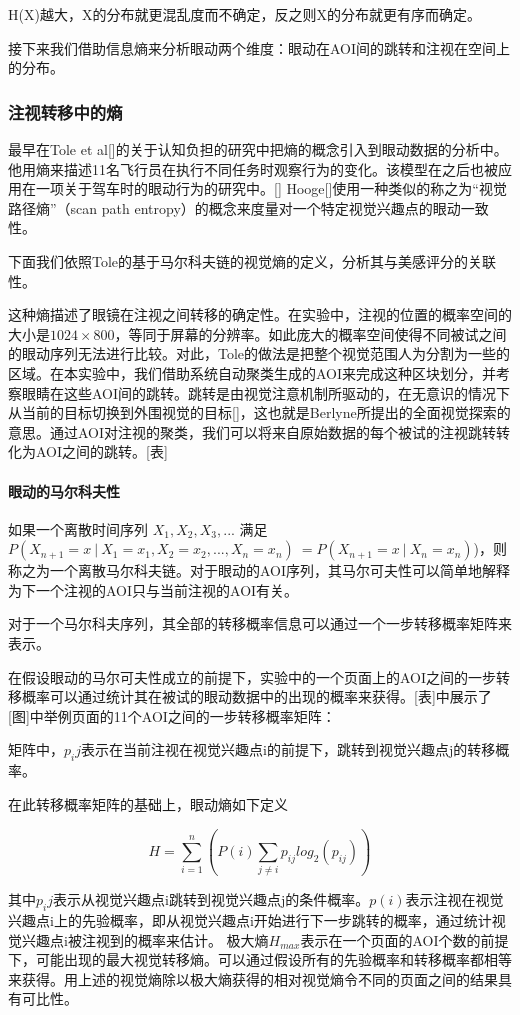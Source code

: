 H(X)越大，X的分布就更混乱度而不确定，反之则X的分布就更有序而确定。

接下来我们借助信息熵来分析眼动两个维度：眼动在AOI间的跳转和注视在空间上的分布。

\subsubsection{注视转移中的熵}
最早在Tole et al[]的关于认知负担的研究中把熵的概念引入到眼动数据的分析中。他用熵来描述11名飞行员在执行不同任务时观察行为的变化。该模型在之后也被应用在一项关于驾车时的眼动行为的研究中。[]
Hooge[]使用一种类似的称之为“视觉路径熵”（scan path entropy）的概念来度量对一个特定视觉兴趣点的眼动一致性。

下面我们依照Tole的基于马尔科夫链的视觉熵的定义，分析其与美感评分的关联性。

这种熵描述了眼镜在注视之间转移的确定性。在实验中，注视的位置的概率空间的大小是$1024\times800$，等同于屏幕的分辨率。如此庞大的概率空间使得不同被试之间的眼动序列无法进行比较。对此，Tole的做法是把整个视觉范围人为分割为一些的区域。在本实验中，我们借助系统自动聚类生成的AOI来完成这种区块划分，并考察眼睛在这些AOI间的跳转。跳转是由视觉注意机制所驱动的，在无意识的情况下从当前的目标切换到外围视觉的目标[]，这也就是Berlyne所提出的全面视觉探索的意思。通过AOI对注视的聚类，我们可以将来自原始数据的每个被试的注视跳转转化为AOI之间的跳转。[表]

\paragraph{眼动的马尔科夫性}
如果一个离散时间序列 $X_1,X_2,X_3,...$ 满足$P(X_{n+1}=x~|~X_1=x_1,X_2=x_2,...,X_n=x_n)~=P(X_{n+1}=x~|~X_n=x_n)$)，则称之为一个离散马尔科夫链。对于眼动的AOI序列，其马尔可夫性可以简单地解释为下一个注视的AOI只与当前注视的AOI有关。

对于一个马尔科夫序列，其全部的转移概率信息可以通过一个一步转移概率矩阵来表示。

在假设眼动的马尔可夫性成立的前提下，实验中的一个页面上的AOI之间的一步转移概率可以通过统计其在被试的眼动数据中的出现的概率来获得。[表]中展示了[图]中举例页面的11个AOI之间的一步转移概率矩阵：

矩阵中，$p_ij$表示在当前注视在视觉兴趣点i的前提下，跳转到视觉兴趣点j的转移概率。

在此转移概率矩阵的基础上，眼动熵如下定义

$$H = \sum_{i=1}^n(P(i)\sum_{j\neq i} p_{ij}log_2(p_{ij}))$$

其中$p_ij$表示从视觉兴趣点i跳转到视觉兴趣点j的条件概率。$p(i)$表示注视在视觉兴趣点i上的先验概率，即从视觉兴趣点i开始进行下一步跳转的概率，通过统计视觉兴趣点i被注视到的概率来估计。
极大熵$H_{max}$表示在一个页面的AOI个数的前提下，可能出现的最大视觉转移熵。可以通过假设所有的先验概率和转移概率都相等来获得。用上述的视觉熵除以极大熵获得的相对视觉熵令不同的页面之间的结果具有可比性。

